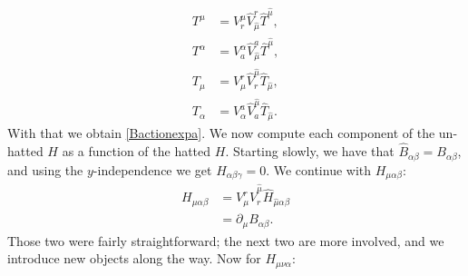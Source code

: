 \documentclass{article}
\begin{document}
\begin{subequations} \label{lowdimv}
    \begin{align}
        T^{\mu} &= V_r^\mu \hat V^r_{\hat \mu}\hat T^{\hat \mu}, \label{scalartrans} \\ 
        T^{\alpha} &= V_a^\alpha \hat V^a_{\hat \mu}\hat T^{\hat \mu}, \label{vectortrans}\\ 
        T_{\mu} &= V_\mu^r \hat V_r^{\hat \mu}\hat T_{\hat \mu}, \label{formtrans}\\  
        T_{\alpha} &= V_\alpha^a \hat V_a^{\hat \mu}\hat T_{\hat \mu}. \label{tenstrans} 
    \end{align}
\end{subequations}
With that we obtain \eqref{Bactionexpa}.
We now compute each component of the un-hatted $H$ as a function of the hatted $H$.
Starting slowly, we have that $\hat B_{\alpha \beta} = B_{\alpha \beta}$, and using the $y$-independence we get $H_{\alpha \beta \gamma} = 0$.
We continue with $H_{\mu \alpha \beta}$:
\begin{equation}
    \begin{aligned}
        H_{\mu \alpha \beta} &= V^r_\mu  \hat V^{\hat \mu}_r \hat H_{\hat \mu \alpha \beta }\\
        & = \partial_\mu B_{\alpha \beta}.
    \end{aligned}
\end{equation}
Those two were fairly straightforward; the next two are more involved, and we introduce new objects along the way.
Now for $H_{\mu \nu \alpha}$:
\end{document}
